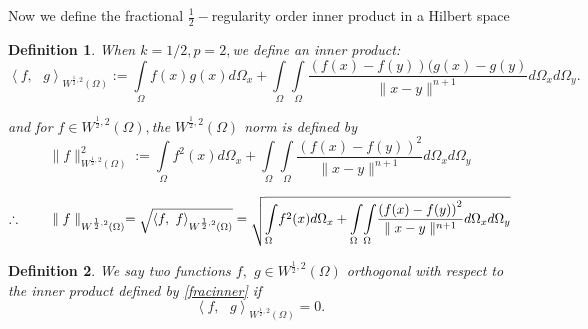 \documentclass{amsart}%
\theoremstyle{plain}
\newtheorem{definition}{Definition}
\numberwithin{equation}{section}
\begin{document}
Now we define the fractional $\frac{1}{2}-$regularity order inner product in a
Hilbert space

\begin{definition}
When $k=1/2,p=2,$we define an inner product:
\begin{equation}
\left\langle f,\text{ }g\right\rangle _{W^{\frac{1}{2},2}(\Omega)}:=%
{\displaystyle\int\limits_{\Omega}}
f(x)g(x)d\Omega_{x}+%
{\displaystyle\int\limits_{\Omega}}
{\displaystyle\int\limits_{\Omega}}
\frac{\left(  f(x)-f(y)\right)  (g(x)-g(y)}{\parallel x-y\parallel^{n+1}%
}d\Omega_{x}d\Omega_{y}.\label{fracinner}%
\end{equation}


and for $f\in W^{\frac{1}{2},2}(\Omega),$the $W^{\frac{1}{2},2}(\Omega)$ norm
is defined by
\[
\parallel f\parallel_{W^{\frac{1}{2},2}(\Omega)}^{2}:=%
{\displaystyle\int\limits_{\Omega}}
f^{2}(x)d\Omega_{x}+%
{\displaystyle\int\limits_{\Omega}}
{\displaystyle\int\limits_{\Omega}}
\frac{\left(  f(x)-f(y)\right)  ^{2}}{\parallel x-y\parallel^{n+1}}d\Omega
_{x}d\Omega_{y}%
\]
%

\[
\therefore\text{ \ \ \ \ \ }\parallel f\parallel_{W^{\frac{1}{2},2}(\Omega
)}=\sqrt{\left\langle f,\text{ }f\right\rangle _{W^{\frac{1}{2},2}(\Omega)}%
}=\sqrt{%
{\displaystyle\int\limits_{\Omega}}
f^{2}(x)d\Omega_{x}+%
{\displaystyle\int\limits_{\Omega}}
{\displaystyle\int\limits_{\Omega}}
\frac{\left(  f(x)-f(y)\right)  ^{2}}{\parallel x-y\parallel^{n+1}}d\Omega
_{x}d\Omega_{y}}%
\]

\end{definition}

\begin{definition}
We say two functions $f,$ $g\in W^{\frac{1}{2},2}\left(  \Omega\right)  $
orthogonal with respect to the inner product defined by \ref{fracinner} if
\begin{equation}
\left\langle f,\text{ }g\right\rangle _{W^{\frac{1}{2},2}(\Omega
)}=0.\label{orthogonality}%
\end{equation}

\end{definition}
\end{document}
